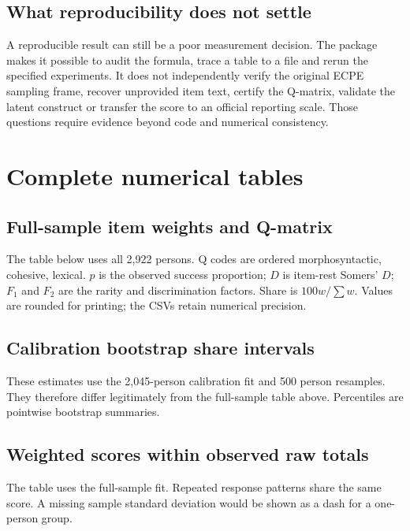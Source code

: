 \documentclass[11pt,a4paper,oneside,headings=normal,parskip=half]{scrreprt}
\begin{document}
\section{What reproducibility does not settle}
A reproducible result can still be a poor measurement decision. The package makes it possible to audit the formula, trace a table to a file and rerun the specified experiments. It does not independently verify the original ECPE sampling frame, recover unprovided item text, certify the Q-matrix, validate the latent construct or transfer the score to an official reporting scale. Those questions require evidence beyond code and numerical consistency.

\clearpage
{}
{}


\appendix

\chapter{Complete numerical tables}\label{app:tables}
\section{Full-sample item weights and Q-matrix}
The table below uses all 2,922 persons. Q codes are ordered morphosyntactic, cohesive, lexical. $p$ is the observed success proportion; $D$ is item-rest Somers' $D$; $F_1$ and $F_2$ are the rarity and discrimination factors. Share is $100w/\sum w$. Values are rounded for printing; the CSVs retain numerical precision.
{\small}
\section{Calibration bootstrap share intervals}
These estimates use the 2,045-person calibration fit and 500 person resamples. They therefore differ legitimately from the full-sample table above. Percentiles are pointwise bootstrap summaries.
{\small}
\clearpage
\section{Weighted scores within observed raw totals}
The table uses the full-sample fit. Repeated response patterns share the same score. A missing sample standard deviation would be shown as a dash for a one-person group.
{\small}
\end{document}
